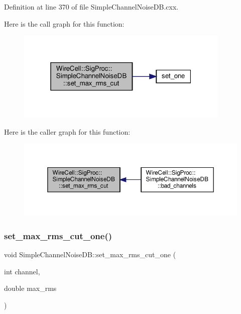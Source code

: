 Definition at line 370 of file Simple\+Channel\+Noise\+D\+B.\+cxx.

Here is the call graph for this function\+:
\nopagebreak
\begin{figure}[H]
\begin{center}
\leavevmode
\includegraphics[width=289pt]{class_wire_cell_1_1_sig_proc_1_1_simple_channel_noise_d_b_a1a5c77d29d9f65e62ce9a811c80ebaca_cgraph}
\end{center}
\end{figure}
Here is the caller graph for this function\+:
\nopagebreak
\begin{figure}[H]
\begin{center}
\leavevmode
\includegraphics[width=350pt]{class_wire_cell_1_1_sig_proc_1_1_simple_channel_noise_d_b_a1a5c77d29d9f65e62ce9a811c80ebaca_icgraph}
\end{center}
\end{figure}
\mbox{\label{class_wire_cell_1_1_sig_proc_1_1_simple_channel_noise_d_b_ab82464e57bc12304c2d90e9eb075a930}} 
\subsubsection{\texorpdfstring{set\+\_\+max\+\_\+rms\+\_\+cut\+\_\+one()}{set\_max\_rms\_cut\_one()}}
{\footnotesize\ttfamily void Simple\+Channel\+Noise\+D\+B\+::set\+\_\+max\+\_\+rms\+\_\+cut\+\_\+one (\begin{DoxyParamCaption}\item[{int}]{channel,  }\item[{double}]{max\+\_\+rms }\end{DoxyParamCaption})}



